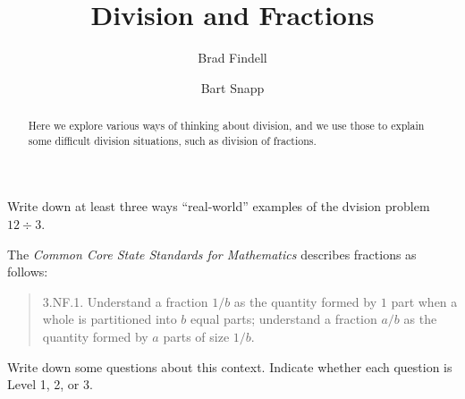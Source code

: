 \documentclass[handout]{ximera}
\title{Division and Fractions}
\author{Brad Findell \and Bart Snapp}
\begin{document}
\begin{abstract}
Here we explore various ways of thinking about division, and we use those to explain some difficult division situations, such as division of fractions.
\end{abstract}
\maketitle


\begin{problem}
Write down at least three ways ``real-world'' examples of the dvision problem $12\div 3$.  
\end{problem}

The \emph{Common Core State Standards for Mathematics} describes fractions as follows: 

\begin{quote}
3.NF.1. Understand a fraction $1/b$ as the quantity formed by $1$ part when a
whole is partitioned into $b$ equal parts; understand a fraction $a/b$ as
the quantity formed by $a$ parts of size $1/b$.
\end{quote}


\begin{problem}
Write down some questions about this context.  Indicate whether each question is Level 1, 2, or 3.  
\end{problem}

%
%
%
%
%
\end{document}
